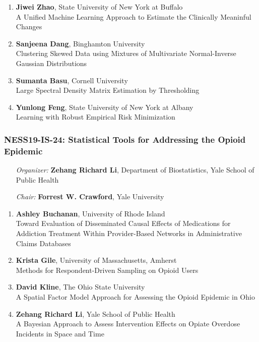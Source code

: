 \begin{enumerate}
\item \textbf{Jiwei Zhao}, State University of New York at Buffalo \\
A Unified Machine Learning Approach to Estimate the Clinically Meaninful Changes
\item \textbf{Sanjeena Dang}, Binghamton University \\
Clustering Skewed Data using Mixtures of Multivariate Normal-Inverse Gaussian Distributions
\item \textbf{Sumanta Basu}, Cornell University \\
Large Spectral Density Matrix Estimation by Thresholding
\item \textbf{Yunlong Feng}, State University of New York at Albany \\
Learning with Robust Empirical Risk Minimization
\end{enumerate}

\subsubsection*{NESS19-IS-24: Statistical Tools for Addressing the Opioid Epidemic}

\begin{enumerate}[align=left]
\item [\emph{Organizer:}] \textbf{Zehang Richard Li}, Department of Biostatistics, Yale School of Public Health
\item [\emph{Chair:}] \textbf{Forrest W. Crawford},  Yale University
\end{enumerate}

\begin{enumerate}
\item \textbf{Ashley Buchanan}, University of Rhode Island \\
Toward Evaluation of Disseminated Causal Effects of Medications for Addiction Treatment Within Provider-Based Networks in Administrative Claims Databases
\item \textbf{Krista Gile}, University of Massachusetts, Amherst \\
Methods for Respondent-Driven Sampling on Opioid Users
\item \textbf{David Kline}, The Ohio State University \\
A Spatial Factor Model Approach for Assessing the Opioid Epidemic in Ohio
\item \textbf{Zehang Richard Li}, Yale School of Public Health \\
A Bayesian Approach to Assess Intervention Effects on Opiate Overdose Incidents in Space and Time
\end{enumerate}

